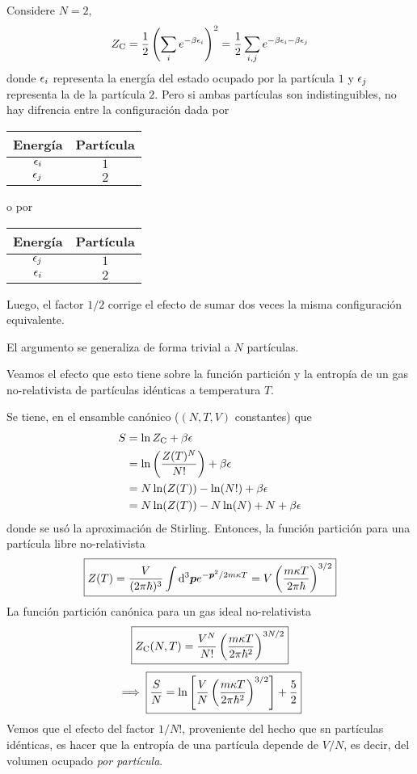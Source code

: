 \begin{ej}
	Considere $N=2$,
	\begin{equation}
  Z_{\rm C}=\frac{1}{2}\left(\sum_i e^{-\beta \epsilon_i}\right)^2=\frac{1}{2}\sum_{i,j}e^{-\beta\epsilon_i-\beta\epsilon_j}
\end{equation}
donde $\epsilon_i$ representa la energía del estado ocupado por la partícula $1$ y $\epsilon_j$ representa la de la partícula $2$. Pero si ambas partículas son indistinguibles, no hay difrencia entre la configuración dada por
\begin{center}
\begin{tabular}{|c|c|}
\hline
 Energía&Partícula\\\hline
 $\epsilon_i$&$1$\\\hline
 $\epsilon_j$&$2$ \\\hline 
\end{tabular}
\end{center}
o por
\begin{center}
\begin{tabular}{|c|c|}
\hline
 Energía&Partícula\\\hline
 $\epsilon_j$&$1$\\\hline
 $\epsilon_i$&$2$ \\\hline 
\end{tabular}
\end{center}
Luego, el factor $1/2$ corrige el efecto de sumar dos veces la misma configuración equivalente.

El argumento se generaliza de forma trivial a $N$ partículas.

Veamos el efecto que esto tiene sobre la función partición y la entropía de un gas no-relativista de partículas idénticas a temperatura $T$.


Se tiene, en el ensamble canónico ($(N,T,V)$ constantes) que
\begin{align}
  S&=\ln Z_{\rm C}+\beta\epsilon \\
  &=\ln\left(\frac{Z(T)^N}{N!}\right)+\beta\epsilon\\
  &=N\ln(Z(T))-\ln(N!)+\beta\epsilon\\
 &= N\ln(Z(T))-N\ln(N)+N+\beta\epsilon 
\end{align}
donde se usó la aproximación de Stirling.
Entonces, la función partición para una partícula libre no-relativista
\begin{equation}
 \boxed{ Z(T)=\frac{V}{(2\pi\hbar)^3}\int\dd^3\vb*{p}e^{-\vb*{p}^2/2m\kappa T}=V\left(\frac{m\kappa T}{2\pi\hbar }\right)^{3/2}}
\end{equation}
La función partición canónica para un gas ideal no-relativista
\begin{equation}
  \boxed{Z_{\rm C}(N,T)=\frac{V^N}{N!}\left(\frac{m\kappa T}{2\pi\hbar^2}\right)^{3N/2}}
\end{equation}
\begin{equation}
  \implies \boxed{\frac{S}{N}=\ln\left[\frac{V}{N}\left(\frac{m\kappa T}{2\pi\hbar^2}\right)^{3/2}\right]+\frac{5}{2}}
\end{equation}
Vemos que el efecto del factor $1/N!$, proveniente del hecho que sn partículas idénticas, es hacer que la entropía de una partícula depende de $V/N$, es decir, del volumen ocupado \textit{por partícula}.
\end{ej}
